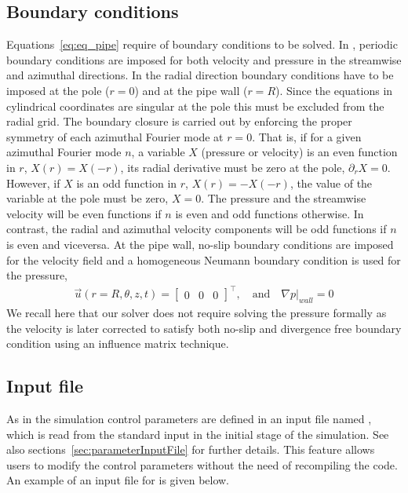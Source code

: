 \documentclass[a4paper, 11pt, DIV=11]{scrartcl}
\begin{document}
\subsection{Boundary conditions}
\label{subsec:bcpipe}
\color{red}
Equations~\eqref{eq:eq_pipe} require of boundary conditions to be solved. In \nsp,
periodic boundary conditions are imposed for both velocity and pressure in the streamwise
and azimuthal directions. In the radial direction boundary conditions have to be imposed
at the pole ($r=0$) and at the pipe wall ($r=R$). Since the equations in cylindrical
coordinates are singular at the pole this must be excluded from the radial grid.
The boundary closure is carried out by enforcing the proper symmetry of each azimuthal
Fourier mode at $r=0$. That is, if for a given azimuthal Fourier mode $n$,
a variable $X$ (pressure or velocity) is an even function in $r$, $X(r) = X(-r)$,
its radial derivative must be zero at the pole, $\partial_r X = 0$. However, if $X$ is
an odd function in $r$, $X(r) = -X(-r)$, the value of the variable at the pole must be zero,
$X = 0$. The pressure and the streamwise velocity will be even functions if
$n$ is even and odd functions otherwise. In contrast, the radial and azimuthal velocity
components will be odd functions if $n$ is even and viceversa. At the pipe wall,
no-slip boundary conditions are imposed for the velocity field and a homogeneous
Neumann boundary condition is used for the pressure,
\begin{align}
  \vec{u}(r=R, \theta, z, t) =
  \begin{bmatrix}
    0 & 0 & 0
  \end{bmatrix}^{\intercal},
  \hspace{1em}\text{and}\hspace{1em}
  \nabla p|_{wall} = 0
  \label{eq:pipe_wallBC}
\end{align}
We recall here that our solver does not require solving the pressure formally
as the velocity is later corrected to satisfy both no-slip and divergence free
boundary condition using an influence matrix technique.

\subsection{Input file}
\label{subsec:input_nspipe}
\color{red}
As in \nsc the simulation control parameters are defined in an input file named
, which is read from the standard input in the initial stage of
the simulation. See also sections~\ref{sec:parameterInputFile} for further details.
This feature allows
users to modify the control parameters without the need of
recompiling the code. An example of an input file for \nsp is
given below.
\end{document}
